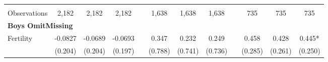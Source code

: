 \begin{landscape}
\begin{table}[htpb!]
\begin{center}
\begin{tabular}{lcccp{2mm}cccp{2mm}ccc}
\begin{footnotesize}\end{footnotesize}&\begin{footnotesize}\end{footnotesize}&\begin{footnotesize}\end{footnotesize}&\begin{footnotesize}\end{footnotesize}&\begin{footnotesize}\end{footnotesize}&\begin{footnotesize}\end{footnotesize}&\begin{footnotesize}\end{footnotesize}&\begin{footnotesize}\end{footnotesize}&\begin{footnotesize}\end{footnotesize}&\begin{footnotesize}\end{footnotesize}&\begin{footnotesize}\end{footnotesize}&\begin{footnotesize}\end{footnotesize}\\Observations&2,182&2,182&2,182&&1,638&1,638&1,638&&735&735&735\\
\multicolumn{12}{l}{\textbf{Boys OmitMissing}}\\ 
Fertility&-0.0827&-0.0689&-0.0693&&0.347&0.232&0.249&&0.458&0.428&0.445*\\
&(0.204)&(0.204)&(0.197)&&(0.788)&(0.741)&(0.736)&&(0.285)&(0.261)&(0.250)\\

\end{tabular}
\end{center}
\end{table}
\end{landscape}

